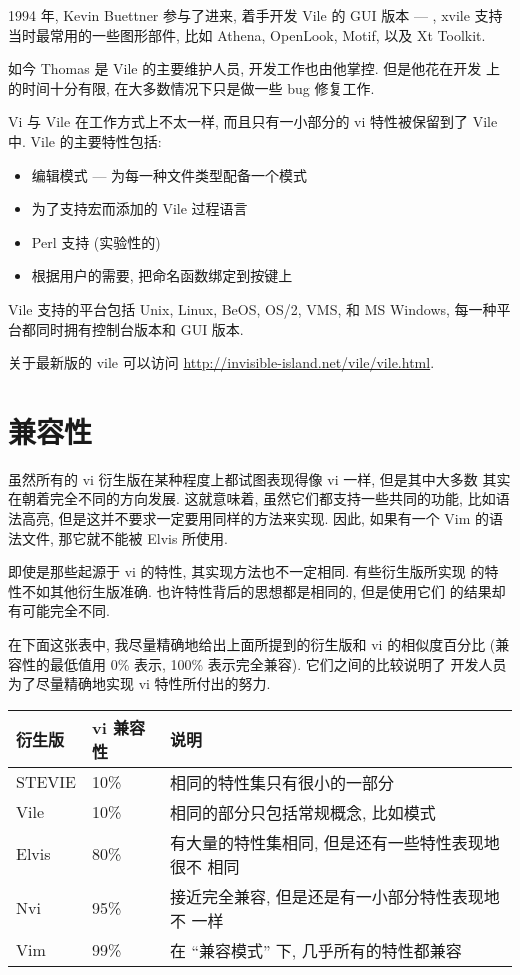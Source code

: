 1994 年, Kevin Buettner 参与了进来, 着手开发 Vile 的 GUI 版本 ---
, xvile 支持当时最常用的一些图形部件, 比如 Athena,
OpenLook, Motif, 以及 Xt Toolkit.

如今 Thomas 是 Vile 的主要维护人员, 开发工作也由他掌控. 但是他花在开发
上的时间十分有限, 在大多数情况下只是做一些 bug 修复工作.

Vi 与 Vile 在工作方式上不太一样, 而且只有一小部分的 vi 特性被保留到了
Vile 中. Vile 的主要特性包括:
\begin{itemize}
    \item 编辑模式 --- 为每一种文件类型配备一个模式
    \item 为了支持宏而添加的 Vile  过程语言
    \item Perl 支持 (实验性的)
    \item 根据用户的需要, 把命名函数绑定到按键上
\end{itemize}

Vile 支持的平台包括 Unix, Linux, BeOS, OS/2, VMS, 和 MS Windows,
每一种平台都同时拥有控制台版本和 GUI 版本.
\begin{warning}
    关于最新版的 vile 可以访问
    \url{http://invisible-island.net/vile/vile.html}.
\end{warning}

\section{兼容性}
\label{sec:compatibility}
虽然所有的 vi 衍生版在某种程度上都试图表现得像 vi 一样, 但是其中大多数
其实在朝着完全不同的方向发展. 这就意味着, 虽然它们都支持一些共同的功能,
比如语法高亮, 但是这并不要求一定要用同样的方法来实现. 因此, 如果有一个 
Vim 的语法文件, 那它就不能被 Elvis 所使用.

即使是那些起源于 vi 的特性, 其实现方法也不一定相同. 有些衍生版所实现
的特性不如其他衍生版准确. 也许特性背后的思想都是相同的, 但是使用它们
的结果却有可能完全不同.

在下面这张表中, 我尽量精确地给出上面所提到的衍生版和 vi 的相似度百分比
(兼容性的最低值用 0\% 表示, 100\% 表示完全兼容). 它们之间的比较说明了
开发人员为了尽量精确地实现 vi 特性所付出的努力.

\begin{tabular}{lll}
    \hline
    \textbf{衍生版}  & \textbf{vi 兼容性} & \textbf{说明} \\
    \hline
    STEVIE  & 10\%      & 相同的特性集只有很小的一部分 \\
    Vile    & 10\%      & 相同的部分只包括常规概念, 比如模式 \\
    Elvis   & 80\%      & 有大量的特性集相同, 但是还有一些特性表现地很不
        相同 \\
    Nvi     & 95\%      & 接近完全兼容, 但是还是有一小部分特性表现地不
        一样 \\
    Vim     & 99\%      & 在 ``兼容模式'' 下, 几乎所有的特性都兼容 \\
    \hline
\end{tabular}

